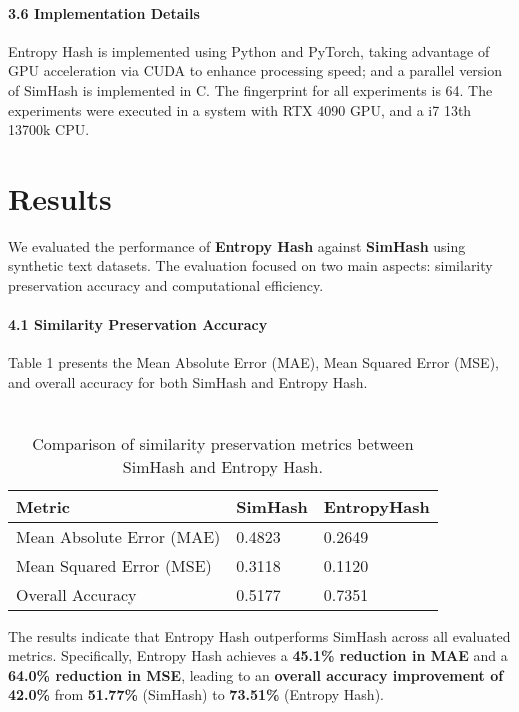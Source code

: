 \documentclass{article}
\begin{document}
\paragraph{\textbf{3.6 Implementation Details}}

Entropy Hash is implemented using Python and PyTorch, taking advantage of GPU acceleration via CUDA to enhance processing speed; and a parallel version of SimHash is implemented in C. The fingerprint for all experiments is 64. The experiments were executed in a system with RTX 4090 GPU, and a i7 13th 13700k CPU.


\section{Results}
\label{sec:headings}

We evaluated the performance of \textbf{Entropy Hash} against \textbf{SimHash} using synthetic text datasets. The evaluation focused on two main aspects: similarity preservation accuracy and computational efficiency.

\paragraph{\textbf{4.1 Similarity Preservation Accuracy}}

Table 1 presents the Mean Absolute Error (MAE), Mean Squared Error (MSE), and overall accuracy for both SimHash and Entropy Hash.

\begin{table}[h]
\centering
\begin{tabular}{lll}
\hline
Metric                    & SimHash & EntropyHash \\
\midrule
Mean Absolute Error (MAE) & 0.4823  & 0.2649      \\
Mean Squared Error (MSE)  & 0.3118  & 0.1120      \\
Overall Accuracy          & 0.5177  & 0.7351      \\
\bottomrule
\end{tabular}
\caption{\\Comparison of similarity preservation
metrics between SimHash and Entropy Hash.}
\end{table}

The results indicate that Entropy Hash outperforms SimHash across all evaluated metrics. Specifically, Entropy Hash achieves a \textbf{45.1\% reduction in MAE} and a \textbf{64.0\% reduction in MSE}, leading to an \textbf{overall accuracy improvement of 42.0\%} from \textbf{51.77\%} (SimHash) to \textbf{73.51\%} (Entropy Hash).
\end{document}
